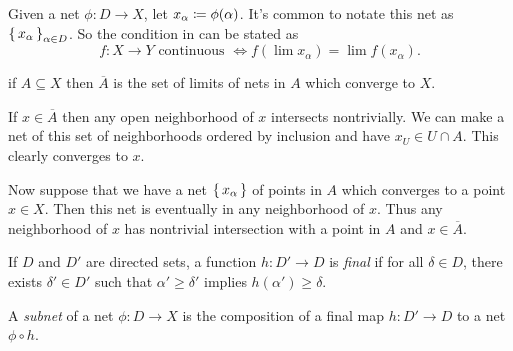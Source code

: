 \documentclass[letterpaper, 11pt]{article}
\begin{document}
Given a net $\phi\colon D \to X$, let $x_{\alpha} \coloneqq \phi(\alpha)$.
It's common to notate this net as $\set{x_{\alpha}}_{\alpha \in D}$.
So the condition in  can be stated as
\[
  f\colon X \to Y \text{ continuous } \iff f(\lim x_{\alpha}) = \lim f(x_{\alpha}).
\]

\begin{prop}
  if $A \subseteq X$ then $\overline{A}$ is the set of limits of nets in $A$ which converge to $X$.
\end{prop}
\begin{pf}
  If $x \in \overline{A}$ then any open neighborhood of $x$ intersects nontrivially.
  We can make a net of this set of neighborhoods ordered by inclusion and have $x_{U} \in U \cap A$.
  This clearly converges to $x$.

  Now suppose that we have a net $\set{x_{\alpha}}$ of points in $A$ which converges to a point $x \in X$.
  Then this net is eventually in any neighborhood of $x$.
  Thus any neighborhood of $x$ has nontrivial intersection with a point in $A$ and $x \in \overline{A}$.
\end{pf}

\begin{defn}
  If $D$ and $D'$ are directed sets, a function $h\colon D' \to D$ is \emph{final} if for all $\delta \in D$, there exists $\delta' \in D'$ such that $\alpha' \geq \delta'$ implies $h(\alpha') \geq \delta$.
\end{defn}

\begin{defn}[Subnets]
  A \emph{subnet} of a net $\phi\colon D \to X$ is the composition of a final map $h\colon D' \to D$ to a net $\phi \circ h$.
\end{defn}

\clearpage
\end{document}
